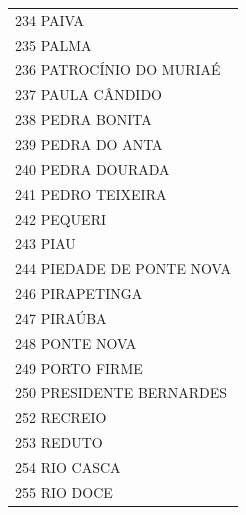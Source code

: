 \documentclass{article}
\begin{document}
\begin{longtable}[c]{m{18cm}}
\multicolumn{1}{l}{ \hspace{2em} 234 PAIVA } \\
\multicolumn{1}{l}{ \hspace{2em} 235 PALMA } \\
\multicolumn{1}{l}{ \hspace{2em} 236 PATROCÍNIO DO MURIAÉ } \\
\multicolumn{1}{l}{ \hspace{2em} 237 PAULA CÂNDIDO } \\
\multicolumn{1}{l}{ \hspace{2em} 238 PEDRA BONITA } \\
\multicolumn{1}{l}{ \hspace{2em} 239 PEDRA DO ANTA } \\
\multicolumn{1}{l}{ \hspace{2em} 240 PEDRA DOURADA } \\
\multicolumn{1}{l}{ \hspace{2em} 241 PEDRO TEIXEIRA } \\
\multicolumn{1}{l}{ \hspace{2em} 242 PEQUERI } \\
\multicolumn{1}{l}{ \hspace{2em} 243 PIAU } \\
\multicolumn{1}{l}{ \hspace{2em} 244 PIEDADE DE PONTE NOVA } \\
\multicolumn{1}{l}{ \hspace{2em} 246 PIRAPETINGA } \\
\multicolumn{1}{l}{ \hspace{2em} 247 PIRAÚBA } \\
\multicolumn{1}{l}{ \hspace{2em} 248 PONTE NOVA } \\
\multicolumn{1}{l}{ \hspace{2em} 249 PORTO FIRME } \\
\multicolumn{1}{l}{ \hspace{2em} 250 PRESIDENTE BERNARDES } \\
\multicolumn{1}{l}{ \hspace{2em} 252 RECREIO } \\
\multicolumn{1}{l}{ \hspace{2em} 253 REDUTO } \\
\multicolumn{1}{l}{ \hspace{2em} 254 RIO CASCA } \\
\multicolumn{1}{l}{ \hspace{2em} 255 RIO DOCE } \\

\end{longtable}
\end{document}
